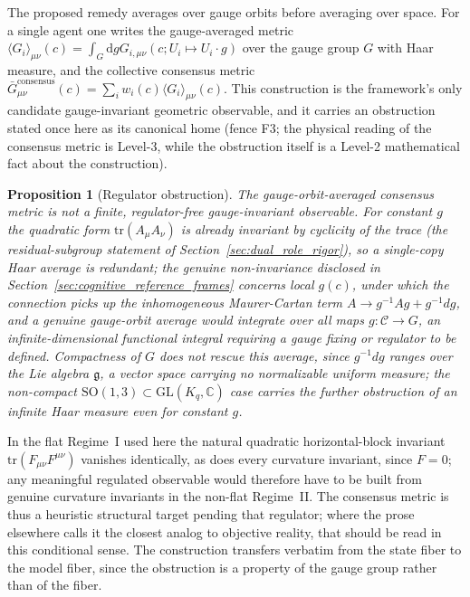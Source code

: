 \documentclass[11pt]{article}
\newtheorem{proposition}{Proposition}
\begin{document}
The proposed remedy averages over gauge orbits before averaging over space. For a single agent one writes the gauge-averaged metric $\langle G_i \rangle_{\mu\nu}(c) = \int_G \mathrm{d}g  G_{i,\mu\nu}(c; U_i \mapsto U_i \cdot g)$ over the gauge group $G$ with Haar measure, and the collective consensus metric $\bar{G}_{\mu\nu}^{\text{consensus}}(c) = \sum_i w_i(c) \langle G_i \rangle_{\mu\nu}(c)$. This construction is the framework's only candidate gauge-invariant geometric observable, and it carries an obstruction stated once here as its canonical home (fence F3; the physical reading of the consensus metric is Level-3, while the obstruction itself is a Level-2 mathematical fact about the construction).
\begin{proposition}[Regulator obstruction]\label{prop:regulator_obstruction}
The gauge-orbit-averaged consensus metric is not a finite, regulator-free gauge-invariant observable. For constant $g$ the quadratic form $\mathrm{tr}(A_\mu A_\nu)$ is already invariant by cyclicity of the trace (the residual-subgroup statement of Section~\ref{sec:dual_role_rigor}), so a single-copy Haar average is redundant; the genuine non-invariance disclosed in Section~\ref{sec:cognitive_reference_frames} concerns local $g(c)$, under which the connection picks up the inhomogeneous Maurer-Cartan term $A \to g^{-1}Ag + g^{-1}dg$, and a genuine gauge-orbit average would integrate over all maps $g: \mathcal{C} \to G$, an infinite-dimensional functional integral requiring a gauge fixing or regulator to be defined. Compactness of $G$ does not rescue this average, since $g^{-1}dg$ ranges over the Lie algebra $\mathfrak{g}$, a vector space carrying no normalizable uniform measure; the non-compact $\mathrm{SO}(1,3) \subset \mathrm{GL}(K_q, \mathbb{C})$ case carries the further obstruction of an infinite Haar measure even for constant $g$.
\end{proposition}
In the flat Regime~I used here the natural quadratic horizontal-block invariant $\mathrm{tr}(F_{\mu\nu}F^{\mu\nu})$ vanishes identically, as does every curvature invariant, since $F = 0$; any meaningful regulated observable would therefore have to be built from genuine curvature invariants in the non-flat Regime~II. The consensus metric is thus a heuristic structural target pending that regulator; where the prose elsewhere calls it the closest analog to objective reality, that should be read in this conditional sense. The construction transfers verbatim from the state fiber to the model fiber, since the obstruction is a property of the gauge group rather than of the fiber.
\end{document}
